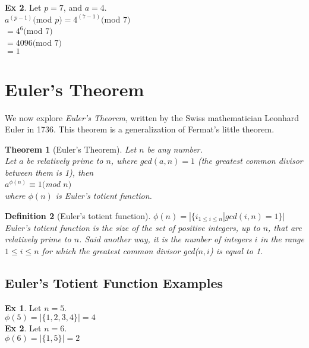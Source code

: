 \documentclass[twoside]{article}
\newcounter{lecnum}
\newtheorem{theorem}{Theorem}[lecnum]
\newtheorem{definition}[theorem]{Definition}
\begin{document}
\textbf{Ex 2}. Let $p = 7$, and $a = 4$. \\

$a^{(p-1)} ($mod $p) = 4^{(7-1)} ($mod $7)$ \\
\hspace*{22mm} $= 4^{6} ($mod $7)$ \\
\hspace*{22mm} $= 4096 ($mod $7)$ \\
\hspace*{22mm} $= 1$ \\

\section{Euler's Theorem}
We now explore \textit{Euler's Theorem}, written by the Swiss mathematician Leonhard Euler in 1736. This theorem is a generalization of Fermat's little theorem. 

\begin{theorem}[Euler's Theorem]
Let $n$ be any number.\\
Let $a$ be relatively prime to $n$, where $gcd(a, n) = 1$ (the greatest common divisor between them is 1), then\\

$a^{\phi(n)} \equiv  1 ($mod $n)$ \\

where $\phi(n)$ is Euler's totient function.
\end{theorem}

\begin{definition}[Euler's totient function]
$\phi(n) = | \{ i_{1 \leq i \leq n} | gcd(i, n) = 1 \}|$ \\
Euler's totient function is the size of the set of positive integers, up to $n$, that are relatively prime to $n$. Said another way, it is the number of integers $i$ in the range $1 \leq i \leq n$ for which the greatest common divisor gcd($n, i$) is equal to 1.
\end{definition}

\subsection{Euler's Totient Function Examples}

\textbf{Ex 1}. Let $n = 5$.\\
$\phi(5) = | \{1, 2, 3, 4\} | = 4$\\

\textbf{Ex 2}. Let $n = 6$.\\
$\phi(6) = | \{1, 5\} | = 2$\\
\end{document}
